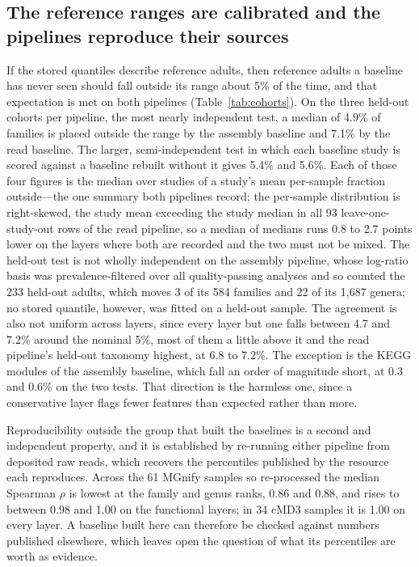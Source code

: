 \documentclass[conference]{IEEEtran}
\begin{document}
\subsection{The reference ranges are calibrated and the pipelines reproduce their sources}

If the stored quantiles describe reference adults, then reference adults a baseline has never seen should fall outside its range about 5\% of the time, and that expectation is met on both pipelines (Table~\ref{tab:cohorts}). On the three held-out cohorts per pipeline, the most nearly independent test, a median of 4.9\% of families is placed outside the range by the assembly baseline and 7.1\% by the read baseline. The larger, semi-independent test in which each baseline study is scored against a baseline rebuilt without it gives 5.4\% and 5.6\%. Each of those four figures is the median over studies of a study's mean per-sample fraction outside---the one summary both pipelines record; the per-sample distribution is right-skewed, the study mean exceeding the study median in all 93 leave-one-study-out rows of the read pipeline, so a median of medians runs 0.8 to 2.7 points lower on the layers where both are recorded and the two must not be mixed. The held-out test is not wholly independent on the assembly pipeline, whose log-ratio basis was prevalence-filtered over all quality-passing analyses and so counted the 233 held-out adults, which moves 3 of its 584 families and 22 of its 1{,}687 genera; no stored quantile, however, was fitted on a held-out sample. The agreement is also not uniform across layers, since every layer but one falls between 4.7 and 7.2\% around the nominal 5\%, most of them a little above it and the read pipeline's held-out taxonomy highest, at 6.8 to 7.2\%. The exception is the KEGG modules of the assembly baseline, which fall an order of magnitude short, at 0.3 and 0.6\% on the two tests. That direction is the harmless one, since a conservative layer flags fewer features than expected rather than more.

Reproducibility outside the group that built the baselines is a second and independent property, and it is established by re-running either pipeline from deposited raw reads, which recovers the percentiles published by the resource each reproduces. Across the 61 MGnify samples so re-processed the median Spearman $\rho$ is lowest at the family and genus ranks, 0.86 and 0.88, and rises to between 0.98 and 1.00 on the functional layers; in 34 cMD3 samples it is 1.00 on every layer. A baseline built here can therefore be checked against numbers published elsewhere, which leaves open the question of what its percentiles are worth as evidence.
\end{document}
